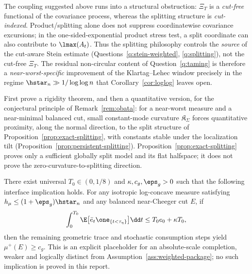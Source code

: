 \documentclass[../../main.tex]{subfiles}
\begin{document}
\begin{remark}
\label{rem:taming-type-mismatch}
The coupling suggested above runs into a
structural obstruction: $\Xi_T$ is a \emph{cut-free} functional of the covariance process,
whereas the splitting structure is \emph{cut-indexed}. Product/splitting alone does not suppress
coordinatewise covariance excursions; in the one-sided-exponential product stress test, a split
coordinate can also contribute to $\lmax(A_t)$. Thus the splitting philosophy controls the
\emph{source} of the cut-aware Stein estimate (Questions~\ref{q:stein-weighted},
\ref{q:splitting}), not the cut-free $\Xi_T$. The residual non-circular content of
Question~\ref{q:taming} is therefore a \emph{near-worst-specific} improvement of the
Klartag--Lehec window precisely in the regime $\hstar_n\gg1/\log\log n$ that
Corollary~\ref{cor:loglog} leaves open.
\end{remark}

\begin{question}
\label{q:splitting}
First prove a rigidity theorem, and then a quantitative version, for the conjectural principle
of Remark~\ref{rem:obata}: for a
near-worst measure and a near-minimal balanced cut, small constant-mode curvature
$\mathfrak K_\Sigma$ forces quantitative proximity, along the normal direction, to the split
structure of Proposition~\ref{prop:exact-splitting}, with constants stable under the
localization tilt (Proposition~\ref{prop:persistent-splitting}). Proposition~\ref{prop:exact-splitting}
proves only a sufficient globally split model and its flat halfspace; it does not prove the
zero-curvature-to-splitting direction.
\end{question}

\begin{assumption}
\label{hyp:absolute-geometric-completion}
There exist universal $T_0\in(0,1/8)$ and $\kappa,c_g,\eps_g>0$ such that the following interface implication
holds. For any isotropic log-concave measure satisfying
$h_\mu\le(1+\eps_g)\hstar_n$ and any balanced near-Cheeger cut $E$, if
\[
  \int_0^{T_0}\E\bigl[\bar e_t\one_{\{t<\tau_\eta\}}\bigr]\dd t
  \le T_0e_0+\kappa T_0,
\]
then the remaining geometric trace and stochastic consumption steps yield
$\mu^+(E)\ge c_g$. This is an explicit placeholder for an absolute-scale completion, weaker
and logically distinct from Assumption~\ref{ass:weighted-package}; no such implication is proved
in this report.
\end{assumption}
\end{document}
